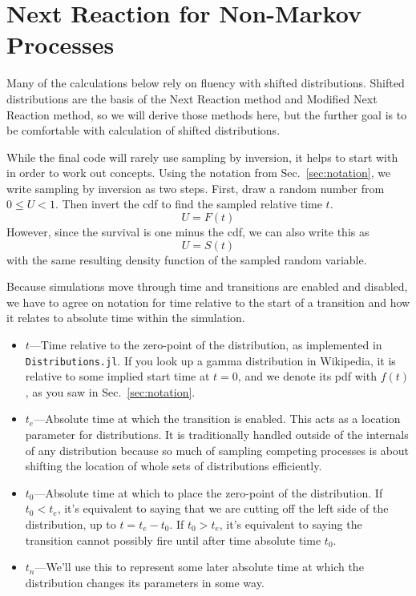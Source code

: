 \documentclass{article}
\begin{document}
\section{Next Reaction for Non-Markov Processes}\label{sec:nextreaction}

Many of the calculations below rely on fluency with shifted distributions. Shifted distributions are the basis of the Next Reaction method and Modified Next Reaction method, so we will derive those methods here, but the further goal is to be comfortable with calculation of shifted distributions.

While the final code will rarely use sampling by inversion, it helps to start with in order to work out concepts. Using the notation from Sec.~\ref{sec:notation}, we write sampling by inversion as two steps. First, draw a random number from $0\le U<1$. Then invert the cdf to find the sampled relative time $t$.
\begin{equation}
	U = F(t)
\end{equation}
However, since the survival is one minus the cdf, we can also write this as
\begin{equation}
	U = S(t)\label{eqn:basesample}
\end{equation}
with the same resulting density function of the sampled random variable.

Because simulations move through time and transitions are enabled and disabled, we have to agree on notation for time relative to the start of a transition and how it relates to absolute time within the simulation.

\begin{itemize}
\item $t$---Time relative to the zero-point of the distribution, as implemented in \texttt{Distributions.jl}. If you look up a gamma distribution in Wikipedia, it is relative to some implied start time at $t=0$, and we denote its pdf with $f(t)$, as you saw in Sec.~\ref{sec:notation}.

\item $t_e$---Absolute time at which the transition is enabled. This acts as a location parameter for distributions. It is traditionally handled outside of the internals of any distribution because so much of sampling competing processes is about shifting the location of whole sets of distributions efficiently.

\item $t_0$---Absolute time at which to place the zero-point of the distribution. If $t_0 < t_e$, it's equivalent to saying that we are cutting off the left side of the distribution, up to $t=t_e-t_0$. If $t_0>t_e$, it's equivalent to saying the transition cannot possibly fire until after time absolute time $t_0$.

\item $t_n$---We'll use this to represent some later absolute time at which the distribution changes its parameters in some way.
\end{itemize}
\end{document}
